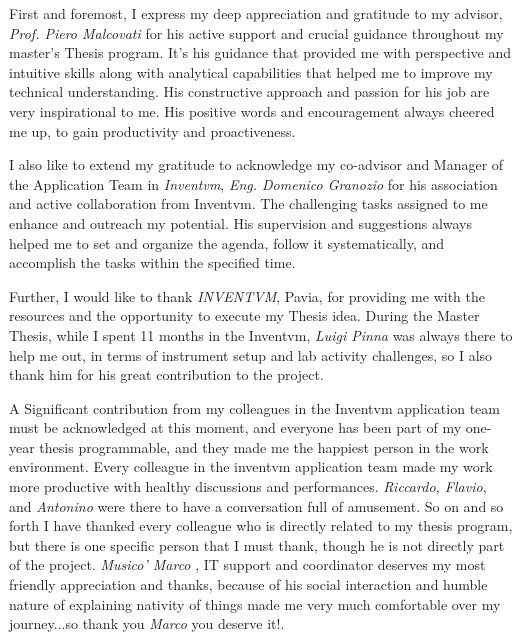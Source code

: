 \thispagestyle{empty} 

\noindent First and foremost, I express my deep appreciation and gratitude to my advisor,
\textit{Prof. Piero Malcovati} for his active support and crucial guidance throughout my master's Thesis program. It’s his guidance that provided me with perspective and intuitive skills along with analytical capabilities that helped me to improve my technical
understanding. His constructive approach and passion for his job are very inspirational to me. His positive words and encouragement always cheered me up, to gain productivity and proactiveness.

I also like to extend my gratitude to acknowledge my co-advisor and Manager of the Application Team in \textit{Inventvm}, \textit{Eng. Domenico Granozio} for his association and active collaboration from Inventvm. The challenging tasks assigned to me enhance and outreach my potential. His supervision and
suggestions always helped me to set and organize the agenda, follow it systematically, and accomplish the tasks within the specified time.


Further, I would like to thank \textit{INVENTVM}, Pavia, for providing me with the resources and the opportunity to execute my Thesis idea. During the Master Thesis, while I spent 11 months in the Inventvm, \textit{Luigi Pinna} was always there to help me out, in terms of instrument setup and lab activity challenges, so I also thank him for his great contribution to the project.

A Significant contribution from my colleagues in the Inventvm application team must be acknowledged at this moment, and everyone has been part of my one-year thesis programmable, and they made me the happiest person in the work environment. Every colleague in the inventvm application team made my work more productive with healthy discussions and performances. \textit{Riccardo, Flavio}, and \textit{Antonino} were there to have a conversation full of amusement.
So on and so forth I have thanked every colleague who is directly related to my thesis program, but there is one specific person that I must thank, though he is not directly part of the project. \textit{Musico' Marco} , IT support and coordinator deserves my most friendly appreciation and thanks, because of his social interaction and humble nature of explaining nativity of things made me very much comfortable over my journey...so thank you \textit{Marco} you deserve it!.
\\\\\\

